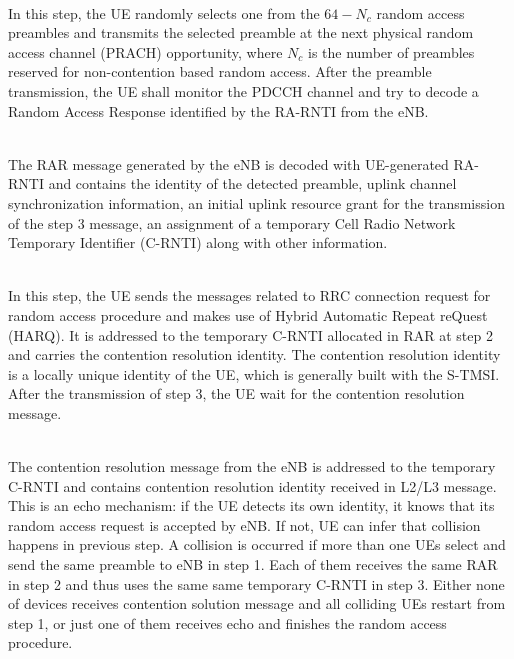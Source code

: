 \begin{description}[font=\normalfont]
	\item[Step 1: Preamble transmission]\hfil \\
	In this step, the UE randomly selects one from the $64-N_c$ random access preambles and transmits the selected preamble at the next physical random access channel (PRACH) opportunity, where $N_c$ is the number of preambles reserved for non-contention based random access. After the preamble transmission, the UE shall monitor the PDCCH channel and try to decode a Random Access Response identified by the RA-RNTI from the eNB. %
	\item[Step 2: Random Access Response (RAR) ]\hfill \\
	The RAR message generated by the eNB is decoded with UE-generated RA-RNTI and contains the identity of the detected preamble, uplink channel synchronization information, an initial uplink resource grant for the transmission of the step 3 message, an assignment of a temporary Cell Radio Network Temporary Identifier (C-RNTI) along with other information. 
	\item[Step 3: L2/L3 message] \hfill \\
	In this step, the UE sends the messages related to RRC connection request for random access procedure and makes use of Hybrid Automatic Repeat reQuest (HARQ). It is addressed to the temporary C-RNTI allocated in RAR at step 2 and carries the contention resolution identity. The contention resolution identity is a locally unique identity of the UE, which is generally built with the S-TMSI. After the transmission of step 3, the UE wait for the contention resolution message.
	\item[Step 4: Contention Resolution Reception] \hfill \\
	The contention resolution message from the eNB is addressed to the temporary C-RNTI and contains contention resolution identity received in L2/L3 message. This is an echo mechanism: if the UE detects its own identity, it knows that its random access request is accepted by eNB. If not, UE can infer that collision happens in previous step. A collision is occurred if more than one UEs select and send the same preamble to eNB in step 1. Each of them receives the same RAR in step 2 and thus uses the same same temporary C-RNTI in step 3. Either none of devices receives contention solution message and all colliding UEs restart from step 1, or just one of them receives echo and finishes the random access procedure.
\end{description}


